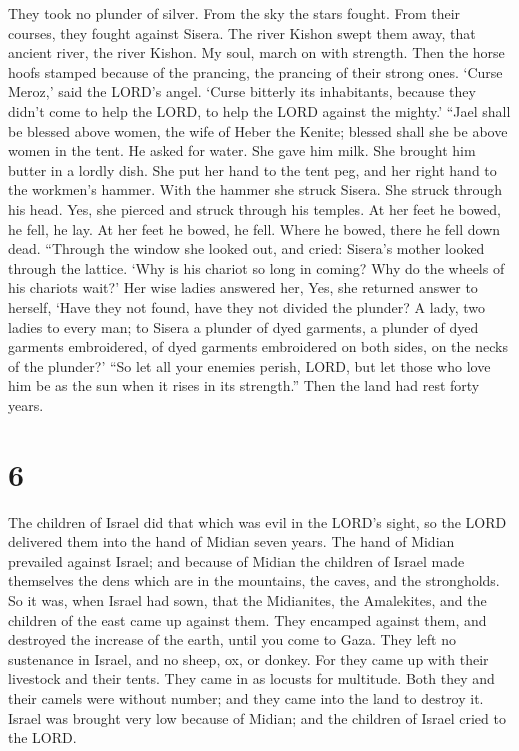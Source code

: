 They took no plunder of silver.  From the sky the stars
fought. From their courses, they fought against Sisera. 
The river Kishon swept them away, that ancient river, the river Kishon.
My soul, march on with strength.  Then the horse hoofs
stamped because of the prancing, the prancing of their strong ones.
 `Curse Meroz,' said the LORD's angel. `Curse bitterly its
inhabitants, because they didn't come to help the LORD, to help the LORD
against the mighty.'  ``Jael shall be blessed above women,
the wife of Heber the Kenite; blessed shall she be above women in the
tent.  He asked for water. She gave him milk. She brought
him butter in a lordly dish.  She put her hand to the tent
peg, and her right hand to the workmen's hammer. With the hammer she
struck Sisera. She struck through his head. Yes, she pierced and struck
through his temples.  At her feet he bowed, he fell, he
lay. At her feet he bowed, he fell. Where he bowed, there he fell down
dead.  ``Through the window she looked out, and cried:
Sisera's mother looked through the lattice. `Why is his chariot so long
in coming? Why do the wheels of his chariots wait?'  Her
wise ladies answered her, Yes, she returned answer to herself,
 `Have they not found, have they not divided the plunder? A
lady, two ladies to every man; to Sisera a plunder of dyed garments, a
plunder of dyed garments embroidered, of dyed garments embroidered on
both sides, on the necks of the plunder?'  ``So let all
your enemies perish, LORD, but let those who love him be as the sun when
it rises in its strength.'' Then the land had rest forty years.

\hypertarget{section-5}{%
\section{6}\label{section-5}}

 The children of Israel did that which was evil in the
LORD's sight, so the LORD delivered them into the hand of Midian seven
years.  The hand of Midian prevailed against Israel; and
because of Midian the children of Israel made themselves the dens which
are in the mountains, the caves, and the strongholds.  So it
was, when Israel had sown, that the Midianites, the Amalekites, and the
children of the east came up against them.  They encamped
against them, and destroyed the increase of the earth, until you come to
Gaza. They left no sustenance in Israel, and no sheep, ox, or donkey.
 For they came up with their livestock and their tents. They
came in as locusts for multitude. Both they and their camels were
without number; and they came into the land to destroy it. 
Israel was brought very low because of Midian; and the children of
Israel cried to the LORD.

